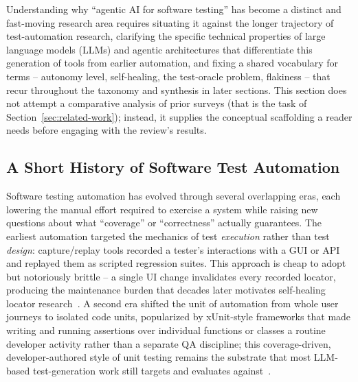 Understanding why ``agentic AI for software testing'' has become a
distinct and fast-moving research area requires situating it against
the longer trajectory of test-automation research, clarifying the
specific technical properties of large language models (LLMs) and
agentic architectures that differentiate this generation of tools from
earlier automation, and fixing a shared vocabulary for terms --
autonomy level, self-healing, the test-oracle problem, flakiness --
that recur throughout the taxonomy and synthesis in later sections.
This section does not attempt a comparative analysis of prior surveys
(that is the task of Section~\ref{sec:related-work}); instead, it
supplies the conceptual scaffolding a reader needs before engaging with
the review's results.

\subsection{A Short History of Software Test Automation}
Software testing automation has evolved through several overlapping
eras, each lowering the manual effort required to exercise a system
while raising new questions about what ``coverage'' or ``correctness''
actually guarantees. The earliest automation targeted the mechanics of
test \emph{execution} rather than test \emph{design}: capture/replay
tools recorded a tester's interactions with a GUI or API and replayed
them as scripted regression suites. This approach is cheap to adopt but
notoriously brittle -- a single UI change invalidates every recorded
locator, producing the maintenance burden that decades later motivates
self-healing locator research~\cite{h2nd,rohamo2024robotframework}.
A second era shifted the unit of automation from whole user journeys to
isolated code units, popularized by xUnit-style frameworks that made
writing and running assertions over individual functions or classes a
routine developer activity rather than a separate QA discipline; this
coverage-driven, developer-authored style of unit testing remains the
substrate that most LLM-based test-generation work still targets and
evaluates against~\cite{slr0072025,slr0082025}.

